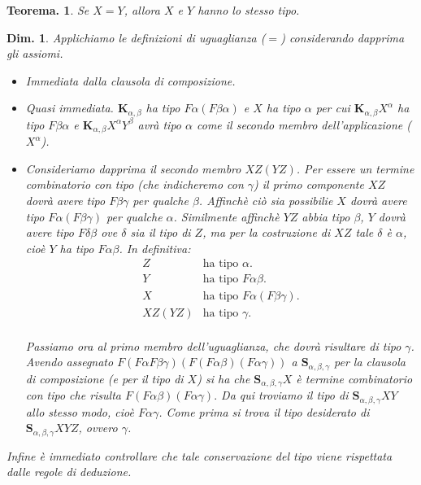 \documentclass{book}
\newtheorem{teorema}{Teorema.}[chapter]
\newtheorem{dimostrazione}{Dim.}[chapter]
\newcommand*{\kk}{\mathbf{K}}    %
\newcommand*{\sss}{\mathbf{S}}   %
\begin{document}
\begin{teorema}
Se $X = Y$, allora $X$ e $Y$ hanno lo stesso tipo.
\end{teorema}

\begin{dimostrazione}
Applichiamo le definizioni di uguaglianza ($=$) considerando dapprima gli 
assiomi.
\begin{itemize}
\item[($I_\alpha$)]Immediata dalla clausola di composizione.
\item[($K_{\alpha,\beta}$)]Quasi immediata. $\kk_{\alpha,\beta}$ ha tipo 
  $F\alpha(F\beta\alpha)$ e $X$ ha tipo $\alpha$ per cui 
  $\kk_{\alpha,\beta}X^\alpha$ ha tipo $F\beta\alpha$ e 
  $\kk_{\alpha,\beta}X^\alpha Y^\beta$ avr\`a tipo $\alpha$ come il secondo 
  membro dell'applicazione ($X^\alpha$).
\item[($S_{\alpha,\beta,\gamma}$)]Consideriamo dapprima il secondo membro 
  $XZ(YZ)$. Per essere un termine combinatorio con tipo (che indicheremo con
  $\gamma$) il primo componente $XZ$ dovr\`a avere tipo  $F\beta\gamma$ per 
  qualche $\beta$. Affinch\`e ci\`o sia possibilie $X$ dovr\`a avere tipo 
  $F\alpha(F\beta\gamma)$ per qualche $\alpha$. Similmente affinch\`e $YZ$
  abbia tipo $\beta$, $Y$ dovr\`a avere tipo $F\delta\beta$ ove $\delta$ sia
  il tipo di $Z$, ma per la costruzione di $XZ$ tale $\delta$ \`e $\alpha$,
  cio\`e $Y$ ha tipo $F\alpha\beta$. In definitiva:
  \[\begin{array}{rl}
    Z & \text{ha tipo } \alpha. \\
    Y & \text{ha tipo } F\alpha\beta. \\
    X & \text{ha tipo } F\alpha(F\beta\gamma). \\
    XZ(YZ) & \text{ha tipo } \gamma. \\
  \end{array}\]

  Passiamo ora al primo membro dell'uguaglianza, che dovr\`a risultare di tipo
  $\gamma$. Avendo assegnato 
  $F(F\alpha F\beta\gamma)(F(F\alpha\beta)(F\alpha\gamma))$ a 
  $\sss_{\alpha,\beta,\gamma}$ per la clausola di composizione (e per il tipo
  di $X$) si ha che $\sss_{\alpha,\beta,\gamma}X$ \`e termine combinatorio con
  tipo che risulta $F(F\alpha\beta)(F\alpha\gamma).$ Da qui troviamo il tipo di
  $\sss_{\alpha,\beta,\gamma}XY$ allo stesso modo, cio\`e $F\alpha\gamma$.
  Come prima si trova il tipo desiderato di $\sss_{\alpha,\beta,\gamma}XYZ$, 
  ovvero $\gamma$.
\end{itemize}
Infine \`e immediato controllare che tale conservazione del tipo viene 
rispettata dalle regole di deduzione.
\end{dimostrazione}
\end{document}
